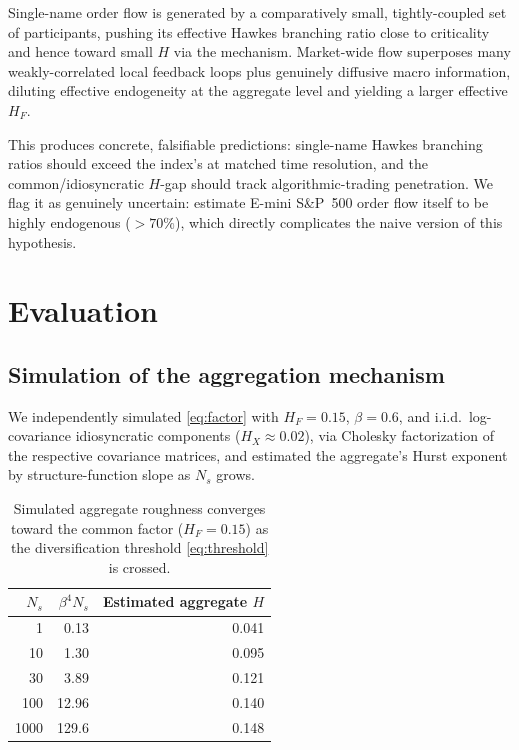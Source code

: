 \documentclass[11pt]{article}
\begin{document}
\begin{conjecture}
Single-name order flow is generated by a comparatively small, tightly-coupled set of participants, pushing its effective Hawkes branching ratio close to criticality and hence toward small $H$ via the \citet{eleuch2018microstructural} mechanism. Market-wide flow superposes many weakly-correlated local feedback loops plus genuinely diffusive macro information, diluting effective endogeneity at the aggregate level and yielding a larger effective $H_F$.
\end{conjecture}

This produces concrete, falsifiable predictions: single-name Hawkes branching ratios should exceed the index's at matched time resolution, and the common/idiosyncratic $H$-gap should track algorithmic-trading penetration. We flag it as genuinely uncertain: \citet{filimonov2015quantifying} estimate E-mini S\&P~500 order flow itself to be highly endogenous ($>70\%$), which directly complicates the naive version of this hypothesis.


\section{Evaluation}

\subsection{Simulation of the aggregation mechanism}

We independently simulated \eqref{eq:factor} with $H_F=0.15$, $\beta=0.6$, and i.i.d.\ log-covariance idiosyncratic components ($H_X\approx0.02$), via Cholesky factorization of the respective covariance matrices, and estimated the aggregate's Hurst exponent by structure-function slope as $N_s$ grows.

\begin{table}[h]
\centering
\begin{tabular}{rrr}
\toprule
$N_s$ & $\beta^4 N_s$ & Estimated aggregate $H$ \\
\midrule
1 & 0.13 & 0.041 \\
10 & 1.30 & 0.095 \\
30 & 3.89 & 0.121 \\
100 & 12.96 & 0.140 \\
1000 & 129.6 & 0.148 \\
\bottomrule
\end{tabular}
\caption{Simulated aggregate roughness converges toward the common factor ($H_F=0.15$) as the diversification threshold \eqref{eq:threshold} is crossed.}
\end{table}
\end{document}
